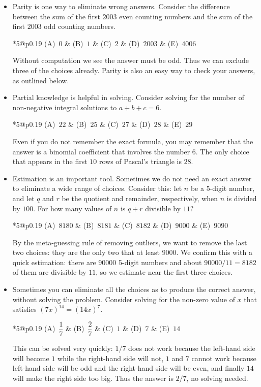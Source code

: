 \documentclass[10pt,paper=letter]{scrartcl}
\makeatletter
\newcommand{\fivech}[5]{
        \begin{tabular}{*{5}{@{}p{0.19\textwidth}}}
(A)~#1 & (B)~#2 & (C)~#3 & (D)~#4 & (E)~#5
        \end{tabular}}
\makeatother
\begin{document}
\begin{itemize}

\item Parity is one way to eliminate wrong answers. Consider the difference between the sum of the first $2003$ even counting numbers and the sum of the first $2003$ odd counting numbers.

\fivech
{$0$}
{$1$}
{$2$}
{$2003$}
{$4006$}

Without computation we see the answer must be odd. Thus we can exclude three of the choices already. Parity is also an easy way to check your answers, as outlined below.

\item Partial knowledge is helpful in solving. Consider solving for the number of non-negative integral solutions to $a + b + c = 6$.

\fivech
{$22$}
{$25$}
{$27$}
{$28$}
{$29$}

Even if you do not remember the exact formula, you may remember that the answer is a binomial coefficient that involves the number $6$. The only choice that appears in the first $10$ rows of Pascal's triangle is $28$.

\item Estimation is an important tool. Sometimes we do not need an exact answer to eliminate a wide range of choices. Consider this: let $n$ be a 5-digit number, and let $q$ and $r$ be the quotient and remainder, respectively, when $n$ is divided by $100$. For how many values of $n$ is $q+r$ divisible by $11$?

\fivech
{$8180$}
{$8181$}
{$8182$}
{$9000$}
{$9090$}

By the meta-guessing rule of removing outliers, we want to remove the last two choices: they are the only two that at least $9000$. We confirm this with a quick estimation: there are $90000$ 5-digit numbers and about $90000/11 = 8182$ of them are divisible by $11$, so we estimate near the first three choices.

\item Sometimes you can eliminate all the choices as to produce the correct answer, without solving the problem. Consider solving for the non-zero value of $x$ that satisfies $(7x)^{14} = (14x)^7$.

\fivech
{$\dfrac{1}{7}$}
{$\dfrac{2}{7}$}
{$1$}
{$7$}
{$14$}

This can be solved very quickly: $1/7$ does not work because the left-hand side will become $1$ while the right-hand side will not, $1$ and $7$ cannot work because left-hand side will be odd and the right-hand side will be even, and finally $14$ will make the right side too big. Thus the answer is $2/7$, no solving needed.


\end{itemize}
\end{document}
